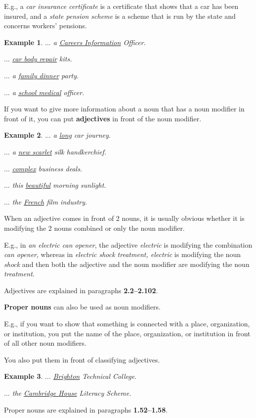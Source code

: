 \documentclass[oneside]{book}
\numberwithin{equation}{section}
\newtheorem{example}{Example}[section]
\begin{document}
E.g., a \textit{car insurance certificate} is a certificate that shows that a car has been insured, and a \textit{state pension scheme} is a scheme that is run by the state and concerns workers' pensions.
\begin{example}
    $\ldots$ a \underline{Careers Information} Officer.
    
    $\ldots$ \underline{car body repair} kits.
    
    $\ldots$ a \underline{family dinner} party.
    
    $\ldots$ a \underline{school medical} officer.
\end{example}
%
\noindent{} If you want to give more information about a noun that has a noun modifier in front of it, you can put \textbf{adjectives} in front of the noun modifier.
\begin{example}
    $\ldots$ a \underline{long} car journey.
    
    $\ldots$ a \underline{new scarlet} silk handkerchief.
    
    $\ldots$ \underline{complex} business deals.
    
    $\ldots$ this \underline{beautiful} morning sunlight.
    
    $\ldots$ the \underline{French} film industry.
\end{example}
When an adjective comes in front of 2 nouns, it is usually obvious whether it is modifying the 2 nouns combined or only the noun modifier.

%
E.g., in \textit{an electric can opener}, the adjective \textit{electric} is modifying the combination \textit{can opener}, whereas in \textit{electric shock treatment, electric} is modifying the noun \textit{shock} and then both the adjective and the noun modifier are modifying the noun \textit{treatment}.

%
Adjectives are explained in paragraphs \textbf{2.2--2.102}.

%
\noindent{} \textbf{Proper nouns} can also be used as noun modifiers.

E.g., if you want to show that something is connected with a place, organization, or institution, you put the name of the place, organization, or institution in front of all other noun modifiers.

You also put them in front of classifying adjectives.
\begin{example}
    $\ldots$ \underline{Brighton} Technical College.
    
    $\ldots$ the \underline{Cambridge House} Literacy Scheme.
\end{example}
Proper nouns are explained in paragraphs \textbf{1.52--1.58}.
\end{document}
